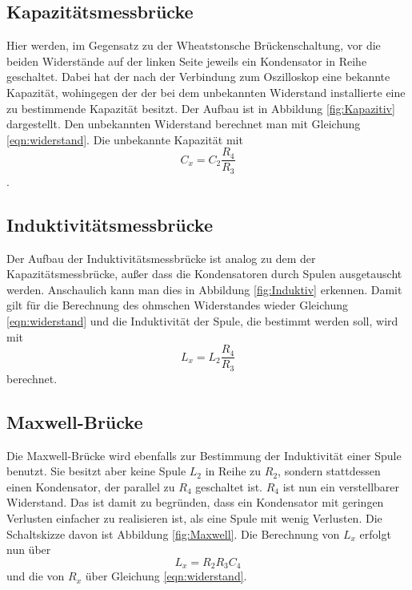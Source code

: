     \subsection{Kapazitätsmessbrücke}
    Hier werden, im Gegensatz zu der Wheatstonsche Brückenschaltung, vor die beiden Widerstände auf der linken Seite jeweils ein Kondensator in Reihe geschaltet.
    Dabei hat der nach der Verbindung zum Oszilloskop eine bekannte Kapazität, wohingegen der der bei dem unbekannten Widerstand installierte eine zu bestimmende Kapazität besitzt.
    Der Aufbau ist in Abbildung \ref{fig:Kapazitiv} dargestellt.
    Den unbekannten Widerstand berechnet man mit Gleichung \ref{eqn:widerstand}.
    Die unbekannte Kapazität mit 
    \begin{equation}
        C_x=C_2 \frac{R_4}{R_3}
        \label{eqn:kapazität}
    \end{equation}.

    \subsection{Induktivitätsmessbrücke}
    Der Aufbau der Induktivitätsmessbrücke ist analog zu dem der Kapazitätsmessbrücke, außer dass die Kondensatoren durch Spulen ausgetauscht werden.
    Anschaulich kann man dies in Abbildung \ref{fig:Induktiv} erkennen.
    Damit gilt für die Berechnung des ohmschen Widerstandes wieder Gleichung \ref{eqn:widerstand} und die Induktivität der Spule, die bestimmt werden soll, wird mit 
    \begin{equation}
        L_x=L_2 \frac{R_4}{R_3}
        \label{eqn:Induktivität}
    \end{equation}
    berechnet.\\

    \subsection{Maxwell-Brücke}
    Die Maxwell-Brücke wird ebenfalls zur Bestimmung der Induktivität einer Spule benutzt.
    Sie besitzt aber keine Spule $L_2$ in Reihe zu $R_2$, sondern stattdessen einen Kondensator, der parallel zu $R_4$ geschaltet ist.
    $R_4$ ist nun ein verstellbarer Widerstand. Das ist damit zu begründen, dass ein Kondensator mit geringen Verlusten einfacher zu realisieren ist, als eine Spule mit wenig Verlusten.
    Die Schaltskizze davon ist Abbildung \ref{fig:Maxwell}.
    Die Berechnung von $L_x$ erfolgt nun über
    \begin{equation}
        L_x=R_2 R_3 C_4
    \end{equation}
    und die von $R_x$ über Gleichung \ref{eqn:widerstand}.


